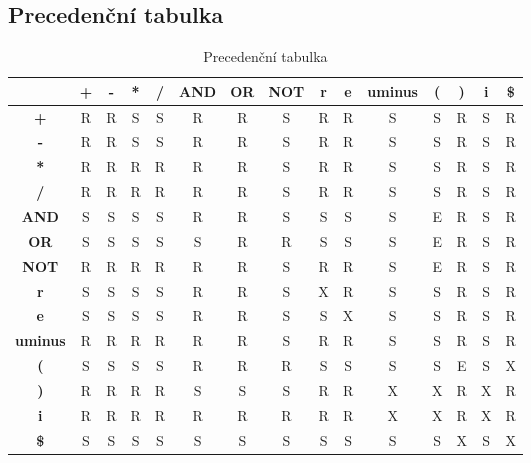 \documentclass[]{ifjclass}
\begin{document}
        \subsection{Precedenční tabulka} 
        \begin{table}[htbp]
        \newpage
    \centering
    \small
    \setlength{\tabcolsep}{4pt}
    \begin{tabular}{|c||c|c|c|c|c|c|c|c|c|c|c|c|c|c|}
        \hline
        & \textbf{+} & \textbf{-} & \textbf{*} & \textbf{/} & \textbf{AND} & \textbf{OR} & \textbf{NOT}
        & \textbf{r} & \textbf{e} & \textbf{uminus} & \textbf{(} & \textbf{)} & \textbf{i} & \textbf{\$} \\
        \hline\hline
        \textbf{+}     & R & R & S & S & R & R & S & R & R & S & S & R & S & R \\ \hline
        \textbf{-}     & R & R & S & S & R & R & S & R & R & S & S & R & S & R \\ \hline
        \textbf{*}     & R & R & R & R & R & R & S & R & R & S & S & R & S & R \\ \hline
        \textbf{/}     & R & R & R & R & R & R & S & R & R & S & S & R & S & R \\ \hline
        \textbf{AND}   & S & S & S & S & R & R & S & S & S & S & E & R & S & R \\ \hline
        \textbf{OR}    & S & S & S & S & S & R & R & S & S & S & E & R & S & R \\ \hline
        \textbf{NOT}   & R & R & R & R & R & R & S & R & R & S & E & R & S & R \\ \hline
        \textbf{r}     & S & S & S & S & R & R & S & X & R & S & S & R & S & R \\ \hline
        \textbf{e}     & S & S & S & S & R & R & S & S & X & S & S & R & S & R \\ \hline
        \textbf{uminus}& R & R & R & R & R & R & S & R & R & S & S & R & S & R \\ \hline
        \textbf{(}     & S & S & S & S & R & R & R & S & S & S & S & E & S & X \\ \hline
        \textbf{)}     & R & R & R & R & S & S & S & R & R & X & X & R & X & R \\ \hline
        \textbf{i}     & R & R & R & R & R & R & R & R & R & X & X & R & X & R \\ \hline
        \textbf{\$}    & S & S & S & S & S & S & S & S & S & S & S & X & S & X \\ \hline
    \end{tabular}
    \caption{Precedenční tabulka}
    \label{tab:precedence}
    \end{table}
\end{document}
